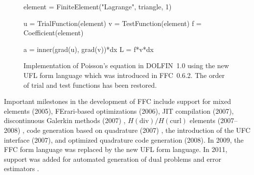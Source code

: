 \begin{figure}
\bwfig
\begin{uflcode}
element = FiniteElement("Lagrange", triangle, 1)

u = TrialFunction(element)
v = TestFunction(element)
f = Coefficient(element)

a = inner(grad(u), grad(v))*dx
L = f*v*dx
\end{uflcode}
\caption{Implementation of Poisson's equation in DOLFIN~1.0 using
  the new UFL form language which was introduced in FFC~0.6.2. The
  order of trial and test functions has been restored.}
\label{fig:logg-1:poisson,ufl}
\end{figure}

Important milestones in the development of FFC include support for
mixed elements (2005), FErari-based optimizations (2006), JIT
compilation (2007), discontinuous Galerkin methods (2007)
\citep{OelgaardLoggWells2008}, $H(\mathrm{div})/H(\mathrm{curl})$
elements (2007--2008) \citep{RognesKirbyLogg2009}, code generation
based on quadrature (2007) \citep{OelgaardWells2010}, the introduction
of the UFC interface (2007), and optimized quadrature code generation
(2008). In 2009, the FFC form language was replaced by the new UFL
form language. In 2011, support was added for automated generation of
dual problems and \apost{} error estimators \citep{RognesLogg2011}.
